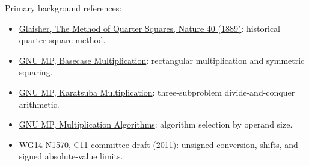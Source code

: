 \documentclass[11pt,a4paper]{article}
\begin{document}
Primary background references:

\begin{itemize}
\item \href{\detokenize{https://www.nature.com/articles/040573c0}}{Glaisher, The Method of Quarter Squares, Nature 40 (1889)}: historical quarter-square method.
\item \href{\detokenize{https://gmplib.org/manual/Basecase-Multiplication}}{GNU MP, Basecase Multiplication}: rectangular multiplication and symmetric squaring.
\item \href{\detokenize{https://gmplib.org/manual/Karatsuba-Multiplication}}{GNU MP, Karatsuba Multiplication}: three-subproblem divide-and-conquer arithmetic.
\item \href{\detokenize{https://gmplib.org/manual/Multiplication-Algorithms}}{GNU MP, Multiplication Algorithms}: algorithm selection by operand size.
\item \href{\detokenize{https://www.open-std.org/jtc1/sc22/wg14/www/docs/n1570.pdf}}{WG14 N1570, C11 committee draft (2011)}: unsigned conversion, shifts, and signed absolute-value limits.
\end{itemize}
\end{document}
